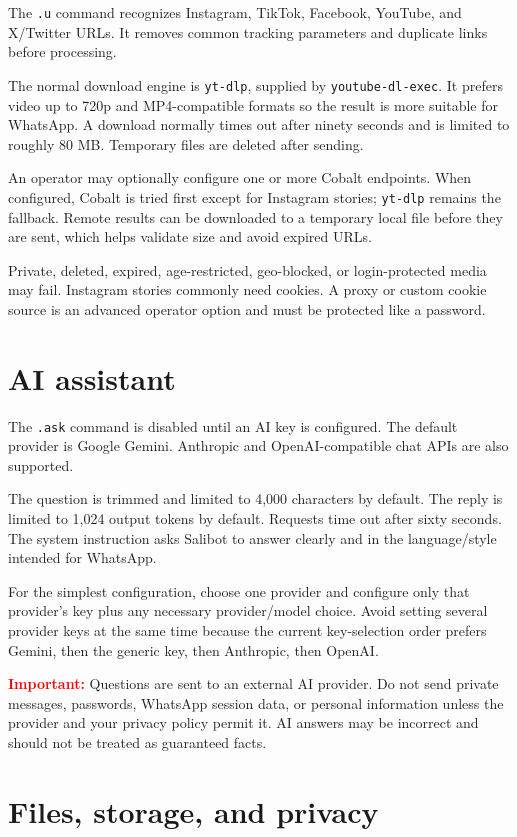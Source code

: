 \documentclass[11pt,a4paper]{article}
\newcommand{\warning}[1]{\textcolor{red}{\textbf{Important:}} #1}
\begin{document}
The \texttt{.u} command recognizes Instagram, TikTok, Facebook, YouTube, and X/Twitter URLs. It removes common tracking parameters and duplicate links before processing.

The normal download engine is \texttt{yt-dlp}, supplied by \texttt{youtube-dl-exec}. It prefers video up to 720p and MP4-compatible formats so the result is more suitable for WhatsApp. A download normally times out after ninety seconds and is limited to roughly 80 MB. Temporary files are deleted after sending.

An operator may optionally configure one or more Cobalt endpoints. When configured, Cobalt is tried first except for Instagram stories; \texttt{yt-dlp} remains the fallback. Remote results can be downloaded to a temporary local file before they are sent, which helps validate size and avoid expired URLs.

Private, deleted, expired, age-restricted, geo-blocked, or login-protected media may fail. Instagram stories commonly need cookies. A proxy or custom cookie source is an advanced operator option and must be protected like a password.

\section{AI assistant}

The \texttt{.ask} command is disabled until an AI key is configured. The default provider is Google Gemini. Anthropic and OpenAI-compatible chat APIs are also supported.

The question is trimmed and limited to 4,000 characters by default. The reply is limited to 1,024 output tokens by default. Requests time out after sixty seconds. The system instruction asks Salibot to answer clearly and in the language/style intended for WhatsApp.

For the simplest configuration, choose one provider and configure only that provider's key plus any necessary provider/model choice. Avoid setting several provider keys at the same time because the current key-selection order prefers Gemini, then the generic key, then Anthropic, then OpenAI.

\warning{Questions are sent to an external AI provider. Do not send private messages, passwords, WhatsApp session data, or personal information unless the provider and your privacy policy permit it. AI answers may be incorrect and should not be treated as guaranteed facts.}

\section{Files, storage, and privacy}
\end{document}
